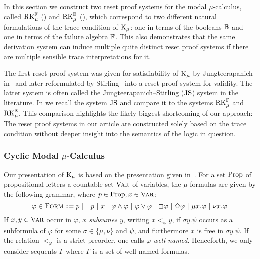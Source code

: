 In this section we construct two reset proof systems for the modal
$\mu$-calculus, called $\mathrm{RK}_\mu^{\mathbb{F}}$ () and $\mathrm{RK}_\mu^{\mathbb{B}}$
(), which correspond to two different
natural formulations of the trace condition of $\mathrm{K}_\mu$: one in terms of the
booleans $\mathbb{B}$ and one in terms of the failure algebra $\mathbb{F}$. This also
demonstrates that the same derivation system can induce multiple quite distinct
reset proof systems if there are multiple sensible trace interpretations for it.

The first reset proof system was given for satisfiability of $\mathrm{K}_\mu$ by Jungteerapanich
in~\parencite{jungteerapanichTableauSystemsModal2010} and later reformulated by
Stirling~\parencite{stirlingProofSystemNames2013} into a reset proof system for
validity. The latter system is often called the Jungteerapanich--Stirling ($\mathrm{JS}$)
system in the literature. In  we recall the system $\mathrm{JS}$ and
compare it to the systems $\mathrm{RK}_\mu^{\mathbb{F}}$ and $\mathrm{RK}_\mu^{\mathbb{B}}$. This comparison highlights
the likely biggest shortcoming of our approach: The reset proof systems in our
article are constructed solely based on the trace condition without deeper
insight into the semantics of the logic in question.

\subsubsection{Cyclic Modal $\mu$-Calculus}
\label{sec:cyclic-mu}

Our presentation of $\mathrm{K}_\mu$ is based on the presentation given
in~\parencite{afshariCutfreeCompletenessModal2017}.
For a set $\mathrm{Prop}$ of propositional letters a countable set $\textsc{Var}$ of variables,
the $\mu$-formulas are given by the following grammar, where \(p \in \mathrm{Prop}, x \in \textsc{Var}\):
\[\varphi \in \form \langeq p ~|~ \neg p ~|~ x ~|~ \varphi \wedge \varphi
  ~|~ \varphi \vee \varphi ~|~ \Box \varphi ~|~ \Diamond \varphi ~|~ \mu
  x.\varphi ~|~ \nu x. \varphi
   \]
If $x, y \in \textsc{Var}$ occur in $\varphi$, \emph{$x$ subsumes $y$},
writing $x <_\varphi y$, if $\sigma y.\psi$ occurs as a
subformula of $\varphi$ for some $\sigma \in \{\mu, \nu\}$ and $\psi$, and
furthermore $x$ is free in $\sigma y.\psi$.
If the relation $<_\varphi$ is a strict preorder, one calls $\varphi$
\emph{well-named}. Henceforth, we only consider sequents $\Gamma$ where $\Gamma$ is a set of
well-named formulas.


